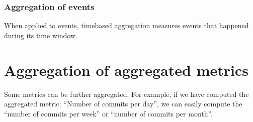 \documentclass[11pt]{article}
\begin{document}
\subsubsection{Aggregation of events}

When applied to events, timebased aggregation measures events that happened during its time window.




\section{Aggregation of aggregated metrics}

Some metrics can be further aggregated. For example, if we have computed the aggregated metric: ``Number of commits per
day'', we can easily compute the ``number of commits per week'' or ``number of commits per month''.
\end{document}

